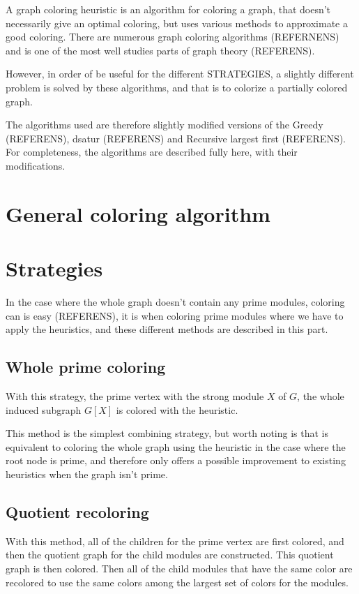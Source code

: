 \documentclass{amsart}
\begin{document}
A graph coloring heuristic is an algorithm for coloring a graph, that doesn't
necessarily give an optimal coloring, but uses various methods to approximate a
good coloring. There are numerous graph coloring algorithms (REFERNENS) and is
one of the most well studies parts of graph theory (REFERENS). 

However, in order of be useful for the different STRATEGIES, a slightly
different problem is solved by these algorithms, and that is to colorize a
partially colored graph.

The algorithms used are therefore slightly modified versions of the 
Greedy (REFERENS), dsatur (REFERENS) and Recursive largest first (REFERENS). For
completeness, the algorithms are described fully here, with their modifications.

\section{General coloring algorithm}



\section{Strategies}


In the case where the whole graph doesn't contain any prime modules, coloring
can is easy (REFERENS), it is when coloring prime modules where we have to apply
the heuristics, and these different methods are described in this part.


\subsection{Whole prime coloring}

With this strategy, the prime vertex with the strong module $X$ of $G$, the
whole induced subgraph $G[X]$ is colored with the heuristic.

This method is the simplest combining strategy, but worth noting is that is
equivalent to coloring the whole graph using the heuristic in the case where the
root node is prime, and therefore only offers a possible improvement to existing
heuristics when the graph isn't prime.

\subsection{Quotient recoloring}

With this method, all of the children for the prime vertex are first colored,
and then the quotient graph for the child modules are constructed. This quotient
graph is then colored. Then all of the child modules that have the same color
are recolored to use the same colors among the largest set of colors for the
modules.
\end{document}
